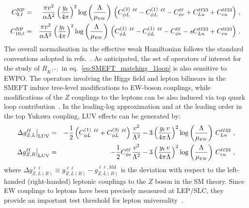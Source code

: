 \begin{eqnarray} 
	\label{eq:_C9_C10}
	C_{9,\ell}^{\rm NP}&=& \frac{\pi v^{2}}{\alpha \Lambda^2} \left(\frac{y_{t} }{4 \pi}\right)^2 \log \left( \frac{\Lambda}{\mu_{\textrm{\tiny{EW}}}} \right)   \, \left(C_{\phi L}^{(3)}\ ^{\ell \ell}-C_{\phi L}^{(1)}\ ^{\ell \ell}-C^{\ell \ell}_{\phi e}+ C_{Lu}^{\ell \ell 3 3} + C_{eu}^{\ell \ell 3 3} \right)\,,\nonumber \\
	C_{10,\ell}^{\rm NP}&=& \frac{\pi v^{2}}{\alpha \Lambda^2} \left(\frac{y_{t} }{4 \pi}\right)^2 \log \left( \frac{\Lambda}{\mu_{\textrm{\tiny{EW}}}} \right)   \, \left(C_{\phi L}^{(1)}\ ^{\ell \ell}-C_{\phi L}^{(1)}\ ^{\ell \ell}-C^{\ell \ell}_{\phi e}-s C_{Lu}^{\ell \ell 3 3} + C_{eu}^{\ell \ell 3 3} \right)\, .
\end{eqnarray} 
The overall normalisation in the effective weak Hamiltonian follows the standard conventions adopted in refs.~\cite{Ciuchini:2015qxb,Ciuchini:2017mik,Ciuchini:2019usw}.
As anticipated, the set of operators of interest for the study of $R_{K^{(*)}}$ in eq.~\eqref{eq:SMEFT_matching_1loop} is also sensitive to EWPO.  The operators involving the Higgs field and lepton bilinears in the SMEFT induce tree-level modifications to EW-boson couplings, while modifications of the $Z$ couplings to the leptons can be also induced via top quark loop
 contribution~\cite{deBlas:2015aea}. In the leading-log approximation and at the leading order in the top Yukawa coupling, LUV effects can be generated by:
%
\begin{eqnarray}
	\label{eq:OLuedRGE}
	\left.\Delta g_{Z,L}^{\ell\ell}\right|_{\mathrm{LUV}} & = &
	- \frac 12 \left( C_{\phi L}^{(1)}\ ^{\ell \ell} +C_{\phi L}^{(3)}\ ^{\ell \ell} \right)\frac{v^2}{\Lambda^2}-
	3 \left( \frac{ y_t \, v}{4 \pi \Lambda} \right)^2 \log\left(\frac{\Lambda}{\mu_{\textrm{\tiny{EW}}}} \right) \, C_{Lu}^{\ell\ell33}  \ , \\ \nonumber
	\left.\Delta g_{Z,R}^{\ell\ell}\right|_{\mathrm{LUV}} & = & 
	- \frac 12 C^{\ell\ell}_{\phi e}\frac{v^2}{\Lambda^2}-
	3 \left( \frac{ y_t \, v}{4 \pi \Lambda} \right)^2 \log\left(\frac{\Lambda }{\mu_{\textrm{\tiny{EW}}}}\right) \, C_{eu}^{\ell\ell33} \ ,
\end{eqnarray}
where $\Delta g_{Z,L (R)}^{\ell\ell} \equiv g_{Z,L(R)}^{\ell\ell} - g_{Z,L (R)}^{\ell\ell,\textrm{SM}}$ is the deviation with respect to the left-handed (right-handed) leptonic couplings to the $Z$ boson in the SM theory. Since EW couplings to leptons have been precisely measured at LEP/SLC, they provide an important test threshold for lepton universality~\cite{Efrati:2015eaa,deBlas:2016ojx}.\\

